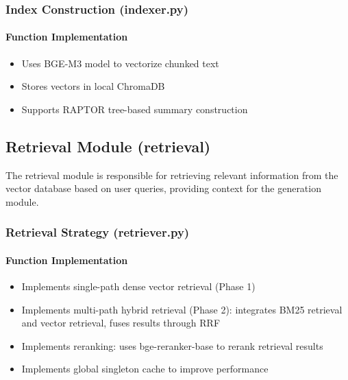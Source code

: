 \subsubsection{Index Construction (indexer.py)}

\paragraph{Function Implementation}
\begin{itemize}
    \item Uses BGE-M3 model to vectorize chunked text
    \item Stores vectors in local ChromaDB
    \item Supports RAPTOR tree-based summary construction
\end{itemize}

\subsection{Retrieval Module (retrieval)}

The retrieval module is responsible for retrieving relevant information from
the vector database based on user queries, providing context for the generation
module.

\subsubsection{Retrieval Strategy (retriever.py)}

\paragraph{Function Implementation}
\begin{itemize}
    \item Implements single-path dense vector retrieval (Phase 1)
    \item Implements multi-path hybrid retrieval (Phase 2): integrates BM25 retrieval and
          vector retrieval, fuses results through RRF
    \item Implements reranking: uses bge-reranker-base to rerank retrieval results
    \item Implements global singleton cache to improve performance
\end{itemize}

